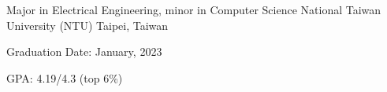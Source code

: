 

\begin{cventries}

  \cventry
  {Major in Electrical Engineering, minor in Computer Science} %
  {National Taiwan University (NTU)} %
  {Taipei, Taiwan} %
  {} %
  {
    \begin{cvitems} %
      \item {Graduation Date: January, 2023}
      \item {GPA: 4.19/4.3 (top 6\%)}
    \end{cvitems}
  }

\end{cventries}
